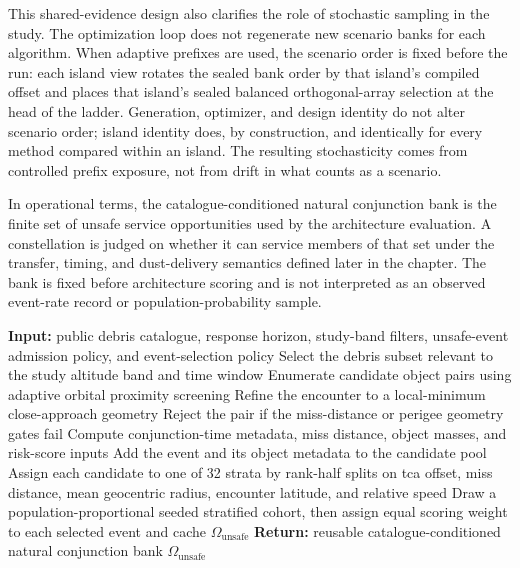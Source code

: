     This shared-evidence design also clarifies the role of stochastic sampling in the study. The optimization loop does not regenerate new scenario banks for each algorithm. When adaptive prefixes are used, the scenario order is fixed before the run: each island view rotates the sealed bank order by that island's compiled offset and places that island's sealed balanced orthogonal-array selection at the head of the ladder. Generation, optimizer, and design identity do not alter scenario order; island identity does, by construction, and identically for every method compared within an island. The resulting stochasticity comes from controlled prefix exposure, not from drift in what counts as a scenario.

    In operational terms, the catalogue-conditioned natural conjunction bank is the finite set of unsafe service opportunities used by the architecture evaluation. A constellation is judged on whether it can service members of that set under the transfer, timing, and dust-delivery semantics defined later in the chapter. The bank is fixed before architecture scoring and is not interpreted as an observed event-rate record or population-probability sample.

    \begin{algorithm}[htb]
    \caption[Natural conjunction-bank workflow]{Catalogue-conditioned natural conjunction-bank workflow used by the baseline evaluation.}
    \label{alg:event_bank}
    \begin{algorithmic}[1]
    \State \textbf{Input:} public debris catalogue, response horizon, study-band filters, unsafe-event admission policy, and event-selection policy
    \State Select the debris subset relevant to the study altitude band and time window
    \State Enumerate candidate object pairs using adaptive orbital proximity screening
        \State Refine the encounter to a local-minimum close-approach geometry
        \State Reject the pair if the miss-distance or perigee geometry gates fail
        \State Compute conjunction-time metadata, miss distance, object masses, and risk-score inputs
            \State Add the event and its object metadata to the candidate pool
        \EndIf
    \EndFor
    \State Assign each candidate to one of 32 strata by rank-half splits on \gls{tca} offset, miss distance, mean geocentric radius, encounter latitude, and relative speed
    \State Draw a population-proportional seeded stratified cohort, then assign equal scoring weight to each selected event and cache \(\Omega_{\mathrm{unsafe}}\)
    \State \textbf{Return:} reusable catalogue-conditioned natural conjunction bank \(\Omega_{\mathrm{unsafe}}\)
    \end{algorithmic}
    \end{algorithm}

